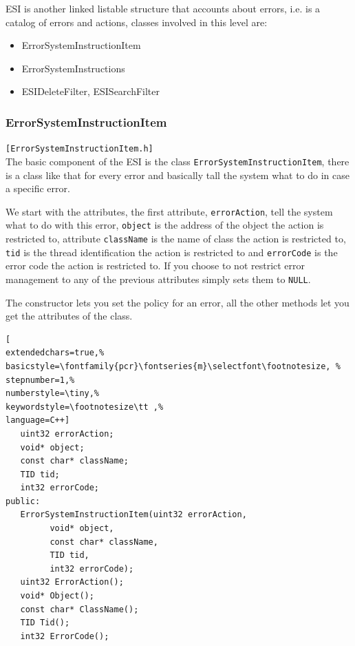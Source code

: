 ESI is another linked listable structure that accounts about errors, i.e. is a catalog of errors and actions, classes involved in this level are:

\begin{itemize}
 \item ErrorSystemInstructionItem
 \item ErrorSystemInstructions
 \item ESIDeleteFilter, ESISearchFilter
\end{itemize}



\subsubsection{ErrorSystemInstructionItem}
\texttt{[ErrorSystemInstructionItem.h]}\\
The basic component of the ESI is the class \texttt{ErrorSystemInstructionItem}, there is a class like that for every error and basically tall the system what to do in case a specific error.

We start with the attributes, the first attribute, \texttt{errorAction}, tell the system what to do with this error, \texttt{object} is the address of the object the action is restricted to, attribute \texttt{className} is the name of class the action is restricted to, \texttt{tid} is the thread identification the action is restricted to and \texttt{errorCode} is the error code the action is restricted to. If you choose to not restrict error management to any of the previous attributes simply sets them to \texttt{NULL}.

The constructor lets you set the policy for an error, all the other methods let you get the attributes of the class.
\begin{lstlisting}[
extendedchars=true,%
basicstyle=\fontfamily{pcr}\fontseries{m}\selectfont\footnotesize, %
stepnumber=1,%
numberstyle=\tiny,%
keywordstyle=\footnotesize\tt ,%
language=C++]
   uint32 errorAction;
   void* object;
   const char* className;
   TID tid;
   int32 errorCode;
public:
   ErrorSystemInstructionItem(uint32 errorAction,
         void* object,
         const char* className,
         TID tid,
         int32 errorCode);
   uint32 ErrorAction();
   void* Object();
   const char* ClassName();
   TID Tid();
   int32 ErrorCode();
\end{lstlisting}


